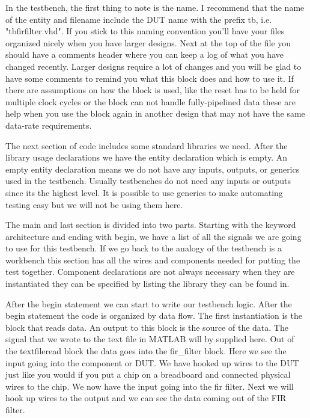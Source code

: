 In the testbench, the first thing to note is the name. I recommend that the name of the entity and filename include the \ac{DUT} name with the prefix tb, i.e. "tbfirfilter.vhd". If you stick to this naming convention you'll have your files organized nicely when you have larger designs. Next at the top of the file you should have a comments header where you can keep a log of what you have changed recently. Larger designs require a lot of changes and you will be glad to have some comments to remind you what this block does and how to use it. If there are assumptions on how the block is used, like the reset has to be held for multiple clock cycles or the block can not handle fully-pipelined data these are help when you use the block again in another design that may not have the same data-rate requirements.

The next section of code includes some standard libraries we need. After the library usage declarations we have the entity declaration which is empty. An empty entity declaration means we do not have any inputs, outputs, or generics used in the testbench. Usually testbenches do not need any inputs or outputs since its the highest level. It is possible to use generics to make automating testing easy but we will not be using them here.

The main and last section is divided into two parts. Starting with the keyword architecture and ending with begin, we have a list of all the signals we are going to use for this testbench. If we go back to the analogy of the testbench is a workbench this section has all the wires and components needed for putting the test together. Component declarations are not always necessary when they are instantiated they can be specified by listing the library they can be found in.

After the begin statement we can start to write our testbench logic. After the begin statement the code is organized by data flow. The first instantiation is the block that reads data. An output to this block is the source of the data. The signal that we wrote to the text file in MATLAB will by supplied here. Out of the textfileread block the data goes into the fir\_filter block. Here we see the input going into the component or \ac{DUT}. We have hooked up wires to the \ac{DUT} just like you would if you put a chip on a breadboard and connected physical wires to the chip. We now have the input going into the fir filter. Next we will hook up wires to the output and we can see the data coming out of the \ac{FIR} filter.

